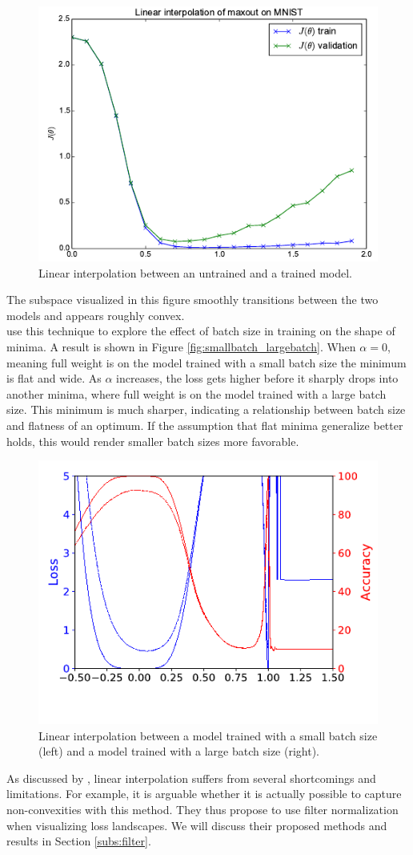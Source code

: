 \documentclass[a4paper]{scrartcl}
\begin{document}
\label{fig:untrained_trained}
\begin{figure}[H]
	\centering
	\includegraphics[width=.5\linewidth]{figures/linear_interpol_1.png}
	\caption{Linear interpolation between an untrained and a trained model.}
\end{figure}
The subspace visualized in this figure smoothly transitions between the two models and appears roughly convex.\\
\cite{li2017visualizing} use this technique to explore the effect of batch size in training on the shape of minima. A result is shown in Figure \ref{fig:smallbatch_largebatch}. When $\alpha =0$, meaning full weight is on the model trained with a small batch size the minimum is flat and wide. As $\alpha$ increases, the loss gets higher before it sharply drops into another minima, where full weight is on the model trained with a large batch size. This minimum is much sharper, indicating a relationship between batch size and flatness of an optimum. If the assumption that flat minima generalize better holds, this would render smaller batch sizes more favorable.
\label{fig:smallbatch_largebatch}
\begin{figure}[H]
	\centering
	\includegraphics[width=.5\linewidth]{figures/batch_size_1.png}
	\caption{Linear interpolation between a model trained with a small batch size (left) and a model trained with a large batch size (right).}
\end{figure}

As discussed by \cite{li2017visualizing}, linear interpolation suffers from several shortcomings  and limitations. For example, it is arguable whether it is actually possible to capture non-convexities with this method. They thus propose to use filter normalization when visualizing loss landscapes. We will discuss their proposed methods and results in Section \ref{subs:filter}.
\end{document}
